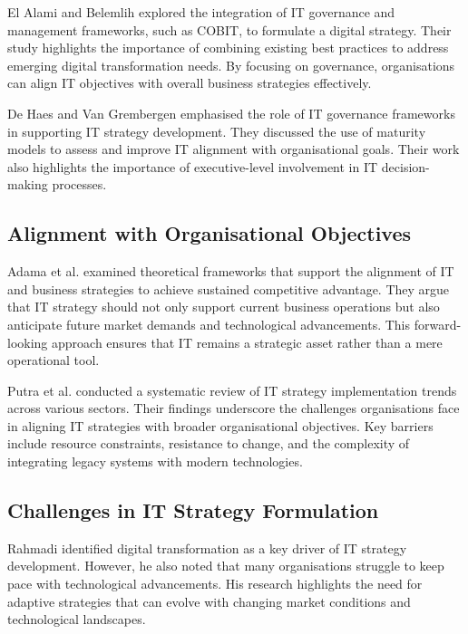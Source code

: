 \documentclass[sigconf]{acmart}
\begin{document}
El Alami and Belemlih \cite{elalami2021digital} explored the integration of IT governance and management frameworks, such as COBIT, to formulate a digital strategy. Their study highlights the importance of combining existing best practices to address emerging digital transformation needs. By focusing on governance, organisations can align IT objectives with overall business strategies effectively.

De Haes and Van Grembergen \cite{dehaes2009governance} emphasised the role of IT governance frameworks in supporting IT strategy development. They discussed the use of maturity models to assess and improve IT alignment with organisational goals. Their work also highlights the importance of executive-level involvement in IT decision-making processes.

\subsection{Alignment with Organisational Objectives}

Adama et al. \cite{adama2024alignment} examined theoretical frameworks that support the alignment of IT and business strategies to achieve sustained competitive advantage. They argue that IT strategy should not only support current business operations but also anticipate future market demands and technological advancements. This forward-looking approach ensures that IT remains a strategic asset rather than a mere operational tool.

Putra et al. \cite{putra2022trends} conducted a systematic review of IT strategy implementation trends across various sectors. Their findings underscore the challenges organisations face in aligning IT strategies with broader organisational objectives. Key barriers include resource constraints, resistance to change, and the complexity of integrating legacy systems with modern technologies.


\subsection{Challenges in IT Strategy Formulation}

Rahmadi \cite{rahmadi2024research} identified digital transformation as a key driver of IT strategy development. However, he also noted that many organisations struggle to keep pace with technological advancements. His research highlights the need for adaptive strategies that can evolve with changing market conditions and technological landscapes.
\end{document}

